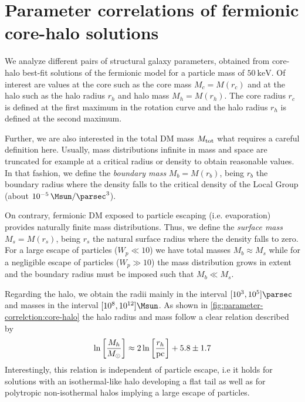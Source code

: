 \section{Parameter correlations of fermionic core-halo solutions}
\label{sec:parameter-correlations}

We analyze different pairs of structural galaxy parameters, obtained from core-halo best-fit solutions of the fermionic model for a particle mass of $\SI{50}{\kilo\eV}$. Of interest are values at the core such as the core mass $M_c = M(r_c)$ and at the halo such as the halo radius $r_h$ and halo mass $M_h = M(r_h)$. The core radius $r_c$ is defined at the first maximum in the rotation curve and the halo radius $r_h$ is defined at the second maximum.

Further, we are also interested in the total DM mass $M_{\rm tot}$ what requires a careful definition here. Usually, mass distributions infinite in mass and space are truncated for example at a critical radius or density to obtain reasonable values. In that fashion, we define the \textit{boundary mass} $M_b = M(r_b)$, being $r_b$ the boundary radius where the density falls to the critical density of the Local Group (about $\SI{E-5}{\Msun\per\parsec^3}$).

On contrary, fermionic DM exposed to particle escaping (i.e. evaporation) provides naturally finite mass distributions. Thus, we define the \textit{surface mass} $M_s = M(r_s)$, being $r_s$ the natural surface radius where the density falls to zero. For a large escape of particles ($W_p \ll 10$) we have total masses $M_b \approx M_s$ while for a negligible escape of particles ($W_p \gg 10$) the mass distribution grows in extent and the boundary radius must be imposed such that $M_b \ll M_s$.


Regarding the halo, we obtain the radii mainly in the interval $[10^3,10^5]\si{\parsec}$ and masses in the interval $[10^8,10^{12}] \si{\Msun}$. As shown in \cref{fig:parameter-correlction:core-halo} the halo radius and mass follow a clear relation described by \begin{equation}
	\label{eqn:rel:Mh-rh}
	\ln \qbracket{\frac{M_h}{M_\odot}} \approx 2\ln \qbracket{\frac{r_h}{\mathrm{pc}}} + 5.8 \pm 1.7
\end{equation} Interestingly, this relation is independent of particle escape, i.e it holds for solutions with an isothermal-like halo developing a flat tail as well as for polytropic non-isothermal halos implying a large escape of particles.



